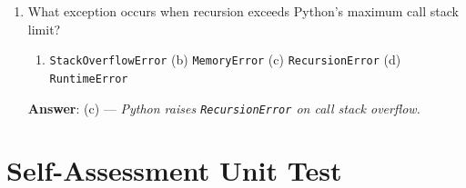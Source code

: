 \begin{enumerate}[leftmargin=1.5em]
    \item What exception occurs when recursion exceeds Python's maximum call stack limit?
    \begin{enumerate}[label=(\alph*)]
        \item \texttt{StackOverflowError} \quad (b) \texttt{MemoryError} \quad (c) \texttt{RecursionError} \quad (d) \texttt{RuntimeError}
    \end{enumerate}
    \textbf{Answer}: (c) --- \textit{Python raises \texttt{RecursionError} on call stack overflow.}
\end{enumerate}

\section{Self-Assessment Unit Test}

